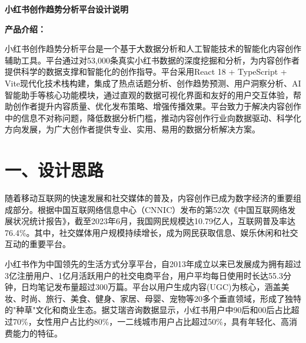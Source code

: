 \documentclass[12pt,a4paper]{article}
\renewcommand{\normalsize}{\fontsize{14pt}{24pt}\selectfont}
\begin{document}
\tableofcontents
\newpage

\setcounter{page}{1}    %
\normalsize

\begin{center}
{\fontsize{18pt}{24pt}\selectfont\bfseries\upshape 小红书创作趋势分析平台设计说明}
\end{center}

\vspace{12pt}

\noindent\textbf{产品介绍：}

小红书创作趋势分析平台是一个基于大数据分析和人工智能技术的智能化内容创作辅助工具。平台通过对53,000条真实小红书数据的深度挖掘和分析，为内容创作者提供科学的数据支撑和智能化的创作指导。平台采用React 18 + TypeScript + Vite现代化技术栈构建，集成了热点话题分析、创作趋势预测、用户洞察分析、AI智能助手等核心功能模块，通过直观的数据可视化界面和友好的用户交互体验，帮助创作者提升内容质量、优化发布策略、增强传播效果。平台致力于解决内容创作中的信息不对称问题，降低数据分析门槛，推动内容创作行业向数据驱动、科学化方向发展，为广大创作者提供专业、实用、易用的数据分析解决方案。

\vspace{12pt}

\section*{一、设计思路}
\setcounter{section}{1}

随着移动互联网的快速发展和社交媒体的普及，内容创作已成为数字经济的重要组成部分。根据中国互联网络信息中心（CNNIC）发布的第52次《中国互联网络发展状况统计报告》\cite{cnnic-report}，截至2023年6月，我国网民规模达10.79亿人，互联网普及率达76.4\%。其中，社交媒体用户规模持续增长，成为网民获取信息、娱乐休闲和社交互动的重要平台。

小红书作为中国领先的生活方式分享平台，自2013年成立以来已发展成为拥有超过3亿注册用户、1亿月活跃用户的社交电商平台，用户平均每日使用时长达55.3分钟，日均笔记发布量超过300万篇\cite{xiaohongshu-impact}。平台以用户生成内容(UGC)为核心，涵盖美妆、时尚、旅行、美食、健身、家居、母婴、宠物等20多个垂直领域，形成了独特的"种草"文化和商业生态\cite{xiaohongshu-hashtag}。据艾瑞咨询数据显示，小红书用户中90后和00后占比超过70\%，女性用户占比约80\%，一二线城市用户占比超过50\%，具有年轻化、高消费能力的特征。
\end{document}

